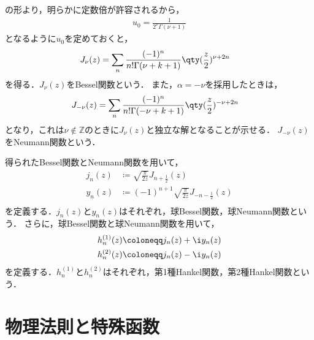 \documentclass{report}
\begin{document}
      の形より，明らかに定数倍が許容されるから，
      \begin{align}
        u_0 = \frac{1}{2^{\nu}\Gamma(\nu + 1)}
      \end{align}
      となるように$u_0$を定めておくと，
      \begin{align}
        J_{\nu}(z) &= \sum_{n}\frac{(-1)^n}{n!\Gamma(\nu + k + 1)}\qty(\frac{z}{2})^{\nu + 2n}
      \end{align}
      を得る．$J_{\nu}(z)$をBessel関数という．
      また，$\alpha = -\nu$を採用したときは，
      \begin{align}
        J_{-\nu}(z) &= \sum_{n}\frac{(-1)^n}{n!\Gamma(-\nu + k + 1)}\qty(\frac{z}{2})^{-\nu + 2n}
      \end{align}
      となり，これは$\nu \notin \mathbb{Z}$のときに$J_{\nu}(z)$と独立な解となることが示せる．
      $J_{-\nu}(z)$をNeumann関数という．
      \par
      得られたBessel関数とNeumann関数を用いて，
      \begin{align}
        j_n(z) &\coloneqq \sqrt{\frac{\pi}{2z}}J_{n + \frac{1}{2}}(z) \\ 
        y_n(z) &\coloneqq (-1)^{n + 1}\sqrt{\frac{\pi}{2z}}J_{-n-\frac{1}{2}}(z) \\ 
      \end{align}
      を定義する．$j_n(z)$と$y_n(z)$はそれぞれ，球Bessel関数，球Neumann関数という．
      さらに，球Bessel関数と球Neumann関数を用いて，
      \begin{align}
        h_n^{(1)}(z) &\coloneqq j_n(z) + \i y_n(z) \\ 
        h_n^{(2)}(z) &\coloneqq j_n(z) - \i y_n(z)
      \end{align}
      を定義する．$h_n^{(1)}$と$h_n^{(2)}$はそれぞれ，第1種Hankel関数，第2種Hankel関数という．
  \chapter{物理法則と特殊函数}
\end{document}
